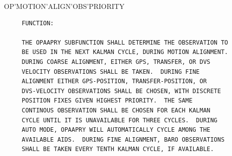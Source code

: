 \begin{frame}
OP'MOTION'ALIGN'OBS'PRIORITY
\begin{verbatim}
     FUNCTION:

     THE OPAAPRY SUBFUNCTION SHALL DETERMINE THE OBSERVATION TO
     BE USED IN THE NEXT KALMAN CYCLE, DURING MOTION ALIGNMENT.
     DURING COARSE ALIGNMENT, EITHER GPS, TRANSFER, OR DVS
     VELOCITY OBSERVATIONS SHALL BE TAKEN.  DURING FINE
     ALIGNMENT EITHER GPS-POSITION, TRANSFER-POSITION, OR
     DVS-VELOCITY OBSERVATIONS SHALL BE CHOSEN, WITH DISCRETE
     POSITION FIXES GIVEN HIGHEST PRIORITY.  THE SAME
     CONTINOUS OBSERVATION SHALL BE CHOSEN FOR EACH KALMAN
     CYCLE UNTIL IT IS UNAVAILABLE FOR THREE CYCLES.  DURING
     AUTO MODE, OPAAPRY WILL AUTOMATICALLY CYCLE AMONG THE
     AVAILABLE AIDS.  DURING FINE ALIGNMENT, BARO OBSERVATIONS
     SHALL BE TAKEN EVERY TENTH KALMAN CYCLE, IF AVAILABLE.

\end{verbatim}
\end{frame}
